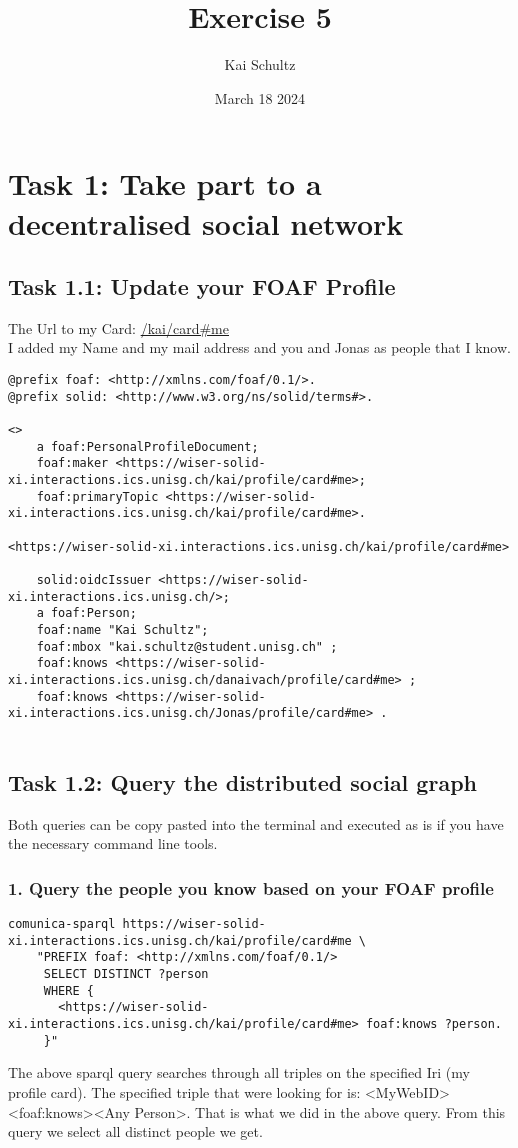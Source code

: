 \documentclass[11pt]{article}
\title{Exercise 5}
\author{Kai Schultz}
\date{March 18 2024} %
\begin{document}
\maketitle

\section*{Task 1: Take part to a decentralised social network}
\subsection*{Task 1.1: Update your FOAF Profile}
The Url to my Card: \href{https://wiser-solid-xi.interactions.ics.unisg.ch/kai/profile/card#me}{/kai/card\#me} \\
I added my Name and my mail address and you and Jonas as people that I know.
\begin{lstlisting}
@prefix foaf: <http://xmlns.com/foaf/0.1/>.
@prefix solid: <http://www.w3.org/ns/solid/terms#>.

<>
    a foaf:PersonalProfileDocument;
    foaf:maker <https://wiser-solid-xi.interactions.ics.unisg.ch/kai/profile/card#me>;
    foaf:primaryTopic <https://wiser-solid-xi.interactions.ics.unisg.ch/kai/profile/card#me>.

<https://wiser-solid-xi.interactions.ics.unisg.ch/kai/profile/card#me>
    
    solid:oidcIssuer <https://wiser-solid-xi.interactions.ics.unisg.ch/>;
    a foaf:Person;
    foaf:name "Kai Schultz";
    foaf:mbox "kai.schultz@student.unisg.ch" ;
    foaf:knows <https://wiser-solid-xi.interactions.ics.unisg.ch/danaivach/profile/card#me> ;
    foaf:knows <https://wiser-solid-xi.interactions.ics.unisg.ch/Jonas/profile/card#me> .
    
\end{lstlisting}

\subsection*{Task 1.2: Query the distributed social graph}
Both queries can be copy pasted into the terminal and executed as is if you have the necessary command line tools.
\subsubsection*{1. Query the people you know based on your FOAF profile}
\begin{lstlisting}
comunica-sparql https://wiser-solid-xi.interactions.ics.unisg.ch/kai/profile/card#me \
    "PREFIX foaf: <http://xmlns.com/foaf/0.1/>
     SELECT DISTINCT ?person
     WHERE {
       <https://wiser-solid-xi.interactions.ics.unisg.ch/kai/profile/card#me> foaf:knows ?person.
     }"    
\end{lstlisting}
The above sparql query searches through all triples on the specified Iri (my profile card). The specified triple that were looking for is: \textless MyWebID\textgreater \textless foaf:knows\textgreater \textless Any Person\textgreater. That is what we did in the above query. From this query we select all distinct people we get.
\end{document}
